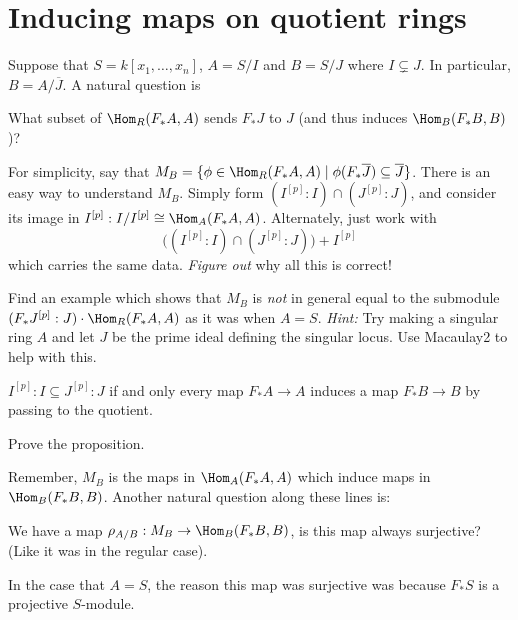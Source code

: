 \documentclass[12pt]{amsart}
\numberwithin{equation}{theorem}
\renewcommand{\:}{\colon}
\begin{document}
\section{Inducing maps on quotient rings}

Suppose that $S = k[x_1, \ldots, x_n]$, $A = S/I$ and $B = S/J$ where $I \subsetneq J$.  In particular, $B = A/\overline{J}$.  A natural question is
\begin{question}
What subset of $\Hom_R(F_* A, A)$ sends $F_* J$ to $J$ (and thus induces $\Hom_B(F_* B, B)$)?
\end{question}
For simplicity, say that $M_B = \{ \phi \in \Hom_R(F_* A, A) \;|\; \phi(F_* \overline{J}) \subseteq \overline{J} \}$.  There is an easy way to understand $M_B$.  Simply form $(I^{[p]} : I) \cap (J^{[p]} : J)$, and consider its image in $I^{[p]} : I / I^{[p]} \cong \Hom_A(F_* A, A)$.  Alternately, just work with
\[
\big( (I^{[p]} : I) \cap (J^{[p]} : J) \big)+ I^{[p]}
\]
which carries the same data.  \emph{Figure out} why all this is correct!
\begin{exercise}
Find an example which shows that $M_B$ is \emph{not} in general equal to the submodule $(F_* J^{[p]} : J) \cdot \Hom_R(F_* A, A)$ as it was when $A = S$.
\vskip 3pt
\emph{Hint:} Try making a singular ring $A$ and let $J$ be the prime ideal defining the singular locus.  Use Macaulay2 to help with this.
\end{exercise}

\begin{proposition}
$I^{[p]} : I \subseteq J^{[p]} : J$ if and only every map $F_* A \to A$ induces a map $F_* B \to B$ by passing to the quotient.
\end{proposition}
\begin{exercise}
Prove the proposition.
\end{exercise}

Remember, $M_B$ is the maps in $\Hom_A(F_* A, A)$ which induce maps in $\Hom_B(F_* B, B)$.  Another natural question along these lines is:

\begin{question}
We have a map $\rho_{A/B} : M_B \to \Hom_B(F_* B, B)$, is this map always surjective?  (Like it was in the regular case).
\end{question}

In the case that $A = S$, the reason this map was surjective was because $F_* S$ is a projective $S$-module.
\end{document}
